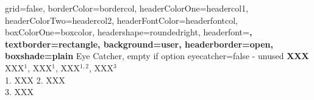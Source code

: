 \documentclass[a0paper,portrait]{baposter}
\begin{document}


\begin{poster}{
	grid=false,
	borderColor=bordercol,
	headerColorOne=headercol1,
	headerColorTwo=headercol2,
	headerFontColor=headerfontcol,
	boxColorOne=boxcolor,
	headershape=roundedright,
	headerfont=\Large\sf\bf,
	textborder=rectangle,
	background=user,
	headerborder=open,
  boxshade=plain
}
{
	Eye Catcher, empty if option eyecatcher=false - unused
}
{\LARGE
\vspace{-0.2em}
	\textbf{XXX} %
}
{
	\vspace{.3em} XXX$^1$, XXX$^1$, XXX$^{1,2}$, XXX$^3$\\ %
	{\small 1. XXX
	 \small 2. XXX\\
	 \small 3. XXX %
}
}
{
\setlength\fboxsep{1pt}
\setlength\fboxrule{1pt}
 }

\end{poster}
\end{document}
